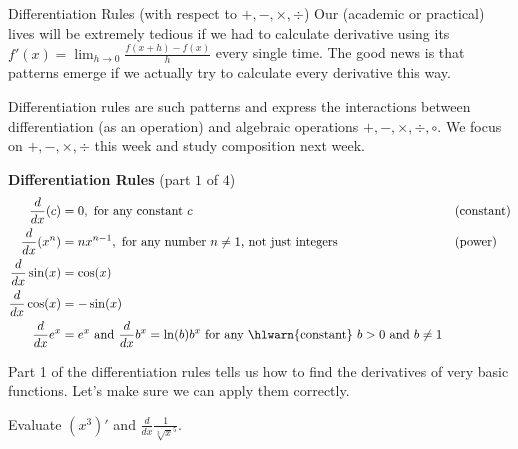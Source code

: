 \documentclass[../main.tex]{subfiles}
\begin{document}
\begin{lesson}{Differentiation Rules (with respect to \(+,-,\times,\div\))}
  Our (academic or practical) lives will be extremely tedious if we had to calculate derivative using its \(f'(x) = \lim_{h \to 0} {\textstyle\frac{f(x+h) - f(x)}{h}}\) every single time.  The good news is that patterns emerge if we actually try to calculate every derivative this way. 

  Differentiation rules are such patterns and express the interactions between differentiation (as an operation) and algebraic operations \(+, -, \times, \div, \circ\). We focus on \(+, -, \times, \div\) this week and study composition next week.

  \begin{mdframed}[style=simple] \label{thm:diff-rules-1}
    \textbf{Differentiation Rules} \hfill {\footnotesize (part \(1\) of \(4\))}
    \begin{align*}
      \frac{d}{dx} (c)
    &= 0, \text{ for any constant \(c\)}
    && \text{(constant)} \\
    \frac{d}{dx} (x^{n})
    &= n x^{n-1}, \text{ for any number \(n \ne 1\), not just integers} 
    && \text{(power)} \\
    \frac{d}{dx} \sin(x)
    &= \cos(x) \\
    \frac{d}{dx} \cos(x)
    &= -\sin(x) \\
      \frac{d}{dx} e^{x} &= e^{x} \text{ and } \frac{d}{dx}b^{x} = \ln(b)b^{x} \text{ for any \hlwarn{constant} } b > 0 \text{ and } b \ne 1
    \end{align*}
  \end{mdframed}

  Part 1 of the differentiation rules tells us how to find the derivatives of very basic functions. Let's make sure we can apply them correctly.

  \begin{example}
    Evaluate \((x^{3})'\) and \(\frac{d}{dx}\frac{1}{\sqrt[3]{x}^{5}}\).

  \end{example}



\end{lesson}
\end{document}
